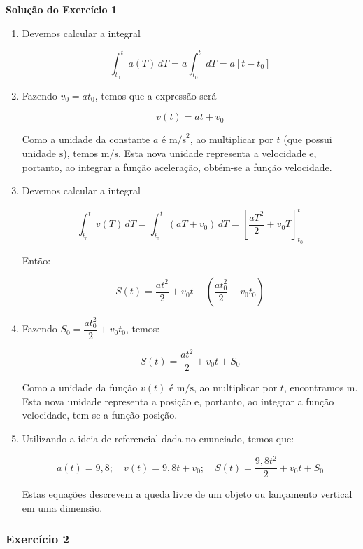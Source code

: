 \documentclass[12pt,openright,twoside,a4paper]{article}
\theoremstyle{definition}
\begin{document}
		\textbf{Solução do Exercício 1}
		
		\begin{enumerate}
			\item[(a)] Devemos calcular a integral
			
			
			\[
			\int_{t_0}^{t} a(T)\,dT = a\int_{t_0}^{t} dT = a[t - t_0]
			\]
			
			
			
			\item[(b)] Fazendo \( v_0 = a t_0 \), temos que a expressão será
			
			
			\[
			v(t) = a t + v_0
			\]
			
			
			Como a unidade da constante \( a \) é \( \text{m/s}^2 \), ao multiplicar por \( t \) (que possui unidade \( \text{s} \)), temos \( \text{m/s} \). Esta nova unidade representa a velocidade e, portanto, ao integrar a função aceleração, obtém-se a função velocidade.
			
			\item[(c)] Devemos calcular a integral
			
			
			\[
			\int_{t_0}^{t} v(T)\,dT = \int_{t_0}^{t} (aT + v_0)\,dT = \left[\dfrac{a T^2}{2} + v_0 T\right]_{t_0}^{t}
			\]
			
			
			Então:
			
			
			\[
			S(t) = \dfrac{a t^2}{2} + v_0 t - \left(\dfrac{a t_0^2}{2} + v_0 t_0\right)
			\]
			
			
			
			\item[(d)] Fazendo \( S_0 = \dfrac{a t_0^2}{2} + v_0 t_0 \), temos:
			
			
			\[
			S(t) = \dfrac{a t^2}{2} + v_0 t + S_0
			\]
			
			
			Como a unidade da função \( v(t) \) é \( \text{m/s} \), ao multiplicar por \( t \), encontramos \( \text{m} \). Esta nova unidade representa a posição e, portanto, ao integrar a função velocidade, tem-se a função posição.
			
			\item[(e)] Utilizando a ideia de referencial dada no enunciado, temos que:
			
			
			\[
			a(t) = 9{,}8; \quad v(t) = 9{,}8t + v_0; \quad S(t) = \dfrac{9{,}8 t^2}{2} + v_0 t + S_0
			\]
			
			
			Estas equações descrevem a queda livre de um objeto ou lançamento vertical em uma dimensão.
		\end{enumerate}
		
		\subsubsection{Exercício 2}
		
\end{document}
